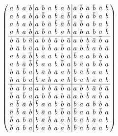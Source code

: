 \documentclass{beamer}
\begin{document}
\begin{frame}

  \[
    \arraycolsep=2.0pt\def\arraystretch{0.75}
    \left(
      \begin{array}{cccc|cccccc|cccccc}
        a&b&a&b&a&b&a&b&a&b&\bar{a}&\bar{b}&\bar{a}&\bar{b}&\bar{a}&\bar{b}\\
        a&b&a&b&\bar{a}&\bar{b}&a&b&\bar{a}&\bar{b}&a&b&\bar{a}&\bar{b}&a&b\\
        a&b&a&b&a&b&\bar{a}&\bar{b}&\bar{a}&\bar{b}&\bar{a}&\bar{b}&a&b&a&b\\
        a&b&a&b&\bar{a}&\bar{b}&\bar{a}&\bar{b}&a&b&a&b&a&b&\bar{a}&\bar{b}\\\hline
        b&\bar{a}&b&\bar{a}&a&b&b&\bar{a}&b&\bar{a}&a&b&b&\bar{a}&\bar{b}&a\\
        b&\bar{a}&b&\bar{a}&a&b&\bar{b}&a&\bar{b}&a&a&b&\bar{b}&a&b&\bar{a}\\
        a&b&\bar{a}&\bar{b}&b&\bar{a}&a&b&b&\bar{a}&\bar{b}&a&a&b&b&\bar{a}\\
        a&b&\bar{a}&\bar{b}&\bar{b}&a&a&b&\bar{b}&a&b&\bar{a}&a&b&\bar{b}&a\\
        b&\bar{a}&\bar{b}&a&b&\bar{a}&b&\bar{a}&a&b&b&\bar{a}&\bar{b}&a&a&b\\
        b&\bar{a}&\bar{b}&a&\bar{b}&a&\bar{b}&a&a&b&\bar{b}&a&b&\bar{a}&a&b\\\hline
        \bar{b}&a&\bar{b}&a&a&b&b&\bar{a}&\bar{b}&a&a&b&b&\bar{a}&b&\bar{a}\\
        \bar{b}&a&\bar{b}&a&a&b&\bar{b}&a&b&\bar{a}&a&b&\bar{b}&a&\bar{b}&a\\
        \bar{a}&\bar{b}&a&b&\bar{b}&a&a&b&b&\bar{a}&b&\bar{a}&a&b&b&\bar{a}\\
        \bar{a}&\bar{b}&a&b&b&\bar{a}&a&b&\bar{b}&a&\bar{b}&a&a&b&\bar{b}&a\\
        \bar{b}&a&b&\bar{a}&b&\bar{a}&\bar{b}&a&a&b&b&\bar{a}&b&\bar{a}&a&b\\
        \bar{b}&a&b&\bar{a}&\bar{b}&a&b&\bar{a}&a&b&\bar{b}&a&\bar{b}&a&a&b\\
      \end{array}
    \right)
  \]
  
\end{frame}

\end{document}
